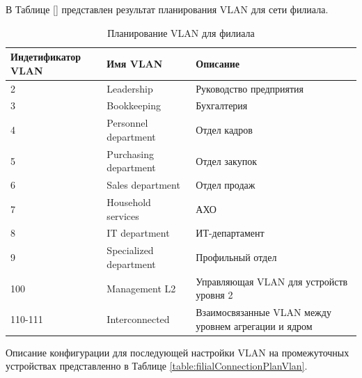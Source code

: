 \documentclass[14pt, a4paper]{extarticle}
\numberwithin{equation}{section}
\begin{document}
В Таблице \ref{} представлен результат планирования VLAN для сети филиала.
\begin{table}[H]
\centering
\small
\caption{Планирование VLAN для филиала}
\begin{tabular}{|l|l|m{6cm}|}
\hline
\textbf{Индетификатор VLAN} & \textbf{Имя VLAN} & \textbf{Описание} \\
\hline
2 & Leadership & Руководство предприятия \\
\hline
3 & Bookkeeping & Бухгалтерия \\
\hline
4 & Personnel department & Отдел кадров \\
\hline 
5 & Purchasing department & Отдел закупок \\
\hline 
6 & Sales department & Отдел продаж \\
\hline 
7 & Household services & АХО \\
\hline 
8 & IT department & ИТ-департамент \\
\hline
9 & Specialized department & Профильный отдел \\
\hline
100 & Management L2 & Управляющая VLAN для устройств уровня 2 \\
\hline
110-111 & Interconnected & Взаимосвязанные VLAN между уровнем агрегации и ядром \\
\hline
\end{tabular}
\end{table}


Описание конфигурации для последующей настройки VLAN на промежуточных устройствах
представленно в Таблице \ref{table:filialConnectionPlanVlan}.
\end{document}
